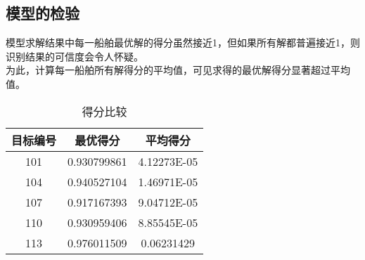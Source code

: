 \subsection{模型的检验}
模型求解结果中每一船舶最优解的得分虽然接近1，但如果所有解都普遍接近1，则识别结果的可信度会令人怀疑。
\\\indent 为此，计算每一船舶所有解得分的平均值，可见求得的最优解得分显著超过平均值。
\begin{table}[htbp]
	\centering
	\caption{得分比较}
	\begin{tabular}{ccc}
		\toprule
		目标编号	&	最优得分	&	平均得分		\\
		\midrule
		101	&	0.930799861	&	4.12273E-05	\\
		104	&	0.940527104	&	1.46971E-05	\\
		107	&	0.917167393	&	9.04712E-05	\\
		110	&	0.930959406	&	8.85545E-05	\\
		113	&	0.976011509	&	0.06231429	\\
		\bottomrule
	\end{tabular}
\end{table}

